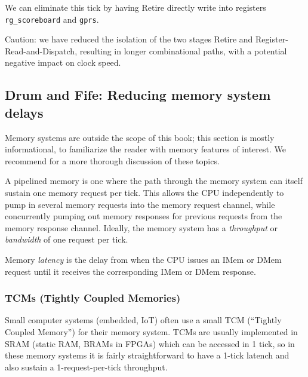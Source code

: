 We can eliminate this tick by having Retire directly write into
registers \verb|rg_scoreboard| and \verb|gprs|.

Caution: we have reduced the isolation of the two stages Retire and
Register-Read-and-Dispatch, resulting in longer combinational paths,
with a potential negative impact on clock speed.


\subsection{Drum and Fife: Reducing memory system delays}

Memory systems are outside the scope of this book; this section is
mostly informational, to familiarize the reader with memory features
of interest.  We recommend \cite{Hennessy2017} for a more thorough
discussion of these topics.

A pipelined memory is one where the path through the memory system can
itself sustain one memory request per tick.  This allows the CPU
independently to pump in several memory requests into the memory
request channel, while concurrently pumping out memory responses for
previous requests from the memory response channel.  Ideally, the
memory system has a \emph{throughput} or \emph{bandwidth} of one
request per tick.

Memory \emph{latency} is the delay from when the CPU issues an IMem or
DMem request until it receives the corresponding IMem or DMem
response.


\subsubsection{TCMs (Tightly Coupled Memories)}




Small computer systems (embedded, IoT) often use a small TCM
(``Tightly Coupled Memory'') for their memory system.  TCMs are
usually implemented in SRAM (static RAM, BRAMs in FPGAs) which can be
accessed in 1 tick, so in these memory systems it is fairly
straightforward to have a 1-tick latench and also sustain a
1-request-per-tick throughput.

